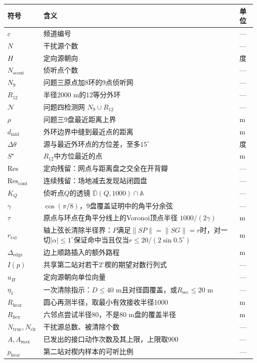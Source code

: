 \documentclass{cumcmthesis}
\begin{document}
\begin{center}
\begin{tabular}{@{}>{\raggedright\arraybackslash}p{}>{\raggedright\arraybackslash}p{}p{}@{}}
\toprule
符号 & 含义 & 单位 \\
\midrule
$c$ & 频道编号 & --- \\
$N$ & 干扰源个数 & --- \\
$H$ & 定向源朝向 & 度 \\
$N_{\mathrm{scout}}$ & 侦听点个数 & --- \\
$N_9$ & 问题三原点加8环的9点侦听网 & --- \\
$R_{12}$ & 半径2000 m的12等分外环 & --- \\
$\mathcal{N}$ & 问题四检测网 $N_9\cup R_{12}$ & --- \\
$\rho$ & 问题三9盘最近距离上界 & m \\
$d_{\mathrm{mid}}$ & 外环边界中缝到最近点的距离 & m \\
$\Delta\theta$ & 源与最近外环点的方位差，至多$15^\circ$ & 度 \\
$S^\star$ & $R_{12}$中方位最近的点 & m \\
$\mathrm{Res}$ & 定向残留：网点与距离盘之交全在开背瓣 & --- \\
$\mathrm{Res}_{\mathrm{cont}}$ & 连续残留：场地减去发现站闭圆盘 & --- \\
$K_Q$ & 侦听点$Q$的透镜 $\overline{\mathbb{D}}(Q,1000)\cap\mathbb{A}$ & --- \\
$\gamma$ & $\cos(\pi/8)$，9盘覆盖证明中的角平分余弦 & --- \\
$\tau$ & 原点与环点在角平分线上的Voronoi顶点半径 $1000/(2\gamma)$ & m \\
$r_{\mathrm{ray}}$ & 轴上弦长清除半径界：$P$满足$\|SP\|=\|SG\|=r$时，对一切$|\alpha|\le 1^\circ$保证命中当且仅当$r\le 20/(2\sin 0.5^\circ)$ & m \\
$\Delta_{\mathrm{edge}}$ & 边上顺路插入的额外路程 & m \\
$I(p)$ & 共享第二站对若干$2^\circ$楔的期望对数行列式 & --- \\
$u_H$ & 定向源朝向单位向量 & --- \\
$\eta_1$ & 一次清除指示：$D\le 40$ m且对径圆覆盖，或$R_{\mathrm{sec}}\le 20$ m & --- \\
$R_{\mathrm{hear}}$ & 圆心再测半径，取最小有效接收半径1000 & m \\
$R_{\mathrm{hex}}$ & 六邻点尝试半径80，不是80 m盘的覆盖半径 & m \\
$N_{\mathrm{true}},N_{\mathrm{clr}}$ & 干扰源总数、被清除个数 & --- \\
$A,A_{\max}$ & 已发出的接口动作次数及其上限，上限取900 & --- \\
$p_{\mathrm{hear}}$ & 第二站对楔内样本的可听比例 & --- \\
\bottomrule
\end{tabular}
\end{center}
\end{document}
